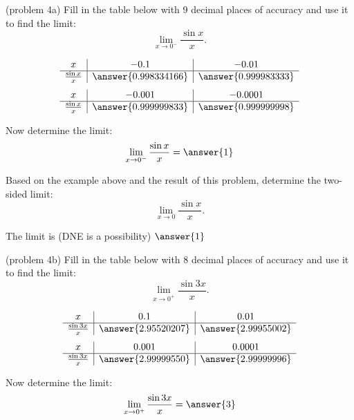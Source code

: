 \documentclass[handout]{ximera}
\begin{document}
\begin{problem}(problem 4a)
Fill in the table below with 9 decimal places of accuracy and use it to find the limit:
\[\lim_{x \to 0^-} \frac{\sin x}{x}.\]

\begin{center}
\[
\begin{array}{ c | c | c }
  x & -0.1 & -0.01   \\ 
	\hline 
	 \frac{\sin x}{x} & \answer{0.998334166} & \answer{0.999983333} 
\end{array}
\]
\[
\begin{array}{ c | c | c  }
  x  & -0.001 & -0.0001 \\ 
	\hline 
	 \frac{\sin x}{x}  & \answer{0.999999833} & \answer{0.999999998}
\end{array}
\]
\end{center}
Now determine the limit:
\[
\lim_{x \to 0^-} \frac{\sin x}{x} = \answer{1}
\]

Based on the example above and the result of this problem, determine the two-sided limit:
\[
\lim_{x \to 0} \frac{\sin x}{x}.
\]

The limit is (DNE is a possibility) $\answer{1}$
\end{problem}



\begin{problem}(problem 4b)
Fill in the table below with 8 decimal places of accuracy and use it to find the limit:
\[\lim_{x \to 0^+} \frac{\sin 3x}{x}.\]

\begin{center}
\[
\begin{array}{ c | c | c }
  x & 0.1 & 0.01   \\ 
	\hline 
	 \frac{\sin 3x}{x} & \answer{2.95520207} & \answer{2.99955002} 
\end{array}
\]
\[
\begin{array}{ c | c | c  }
  x  & 0.001 & 0.0001 \\ 
	\hline 
	 \frac{\sin 3x}{x}  & \answer{2.99999550} & \answer{2.99999996}
\end{array}
\]
\end{center}
Now determine the limit:
\[
\lim_{x \to 0^+} \frac{\sin 3x}{x} = \answer{3}
\]
\end{problem}
\end{document}
